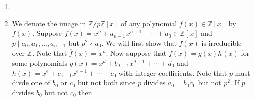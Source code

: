 \documentclass[12pt]{article}
\begin{document}
\begin{enumerate}
\item %
\item %
We denote the image 
in $\mathbb{Z}/p\mathbb{Z}\left[x\right]$ 
of any polynomial $f\left(x\right)\in\mathbb{Z}\left[x\right]$
by $\overline{f}\left(x\right)$.
Suppose $f\left(x\right)=x^n+a_{n-1}x^{n-1}+\cdots+a_0
\in\mathbb{Z}\left[x\right]$
and $p\mid a_0,a_1,\ldots,a_{n-1}$ but $p^2\nmid a_0$.
We will first show that $f\left(x\right)$
is irreducible over $\mathbb{Z}$.
Note that $\overline{f}\left(x\right)=x^n$.
Now suppose that $f\left(x\right)=g\left(x\right)h\left(x\right)$
for some polynomials $g\left(x\right)
=x^d+b_{d-1}x^{d-1}+\cdots+d_0$
and $h\left(x\right)=x^e+c_{e-1}x^{e-1}+\cdots+c_0$
with integer coefficients.
Note that $p$ must divde one of $b_0$ or $c_0$ but
not both since $p$ divides $a_0=b_0c_0$ but not $p^2$.
If $p$ divides $b_0$ but not $c_0$ then

\end{enumerate}
\end{document}
